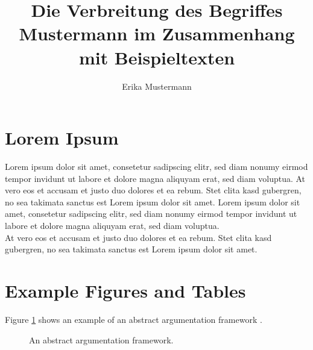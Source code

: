 \documentclass[master,twoside,binding,palatino]{AIGpaper}
\author{Erika Mustermann}
\title{Die Verbreitung des Begriffes \glqq{}Mustermann\grqq{} im Zusammenhang mit Beispieltexten}
\begin{document}
\maketitle%


\tableofcontents%
\cleardoublepage%





\section{Lorem Ipsum}
Lorem ipsum dolor sit amet, consetetur sadipscing elitr, sed diam nonumy eirmod tempor invidunt ut labore et dolore magna aliquyam erat, sed diam voluptua. At vero eos et accusam et justo duo dolores et ea rebum. Stet clita kasd gubergren, no sea takimata sanctus est Lorem ipsum dolor sit amet. Lorem ipsum dolor sit amet, consetetur sadipscing elitr, sed diam nonumy eirmod tempor invidunt ut labore et dolore magna aliquyam erat, sed diam voluptua.\\
At vero eos et accusam et justo duo dolores et ea rebum. Stet clita kasd gubergren, no sea takimata sanctus est Lorem ipsum dolor sit amet.


\section{Example Figures and Tables}

Figure \ref{fig:af} shows an example of an abstract argumentation framework \cite{dung1995acceptability}.

\begin{figure}[ht]
    \centering
    \caption{An abstract argumentation framework.}
    \label{fig:af}
\end{figure}
\end{document}
